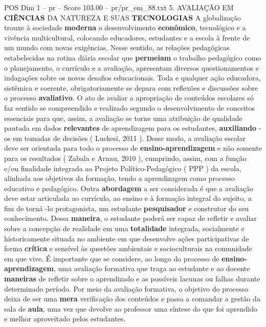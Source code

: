 \begin{textsample}{POS Dim 1 – pr – Score 103.00 – pr/pr\_em\_88.txt}  \label{ex:f1_pos_021}
5.
AVALIAÇÃO EM \textbf{CIÊNCIAS} DA NATUREZA E SUAS \textbf{TECNOLOGIAS} A globalização trouxe à sociedade \textbf{moderna} o desenvolvimento \textbf{econômico}, tecnológico e a vivência multicultural, colocando educadores, estudantes e a escola à frente de um mundo com novas exigências.
Nesse sentido, as relações pedagógicas estabelecidas na rotina diária escolar que \textbf{permeiam} o trabalho pedagógico como o planejamento, o currículo e a avaliação, apresentam diversos questionamentos e indagações sobre os novos desafios educacionais.
Toda e qualquer ação educadora, sistêmica e coerente, obrigatoriamente se depara com reflexões e discussões sobre o processo \textbf{avaliativo}.
O ato de avaliar a apropriação de conteúdos escolares só faz sentido se compreendido e realizado segundo o desenvolvimento de conceitos essenciais para que, assim, a avaliação se torne uma atribuição de qualidade pautada em dados \textbf{relevantes} de aprendizagem para os estudantes, \textbf{auxiliando} -os em tomadas de decisões ( Luckesi, 2011 ).
Desse modo, a avaliação escolar deve ser orientada para todo o processo de \textbf{ensino-aprendizagem} e não somente para os resultados ( Zabala e Arnau, 2010 ), cumprindo, assim, com a função e/ou finalidade integrada ao Projeto Político-Pedagógico ( PPP ) da escola, alinhada aos objetivos da formação, tendo a aprendizagem como processo educativo e pedagógico.
Outra \textbf{abordagem} a ser considerada é que a avaliação deve estar articulada ao currículo, ao ensino e à formação integral do sujeito, a fim de torná -lo protagonista, um estudante \textbf{pesquisador} e construtor do seu conhecimento.
Dessa \textbf{maneira}, o estudante poderá ser capaz de refletir e avaliar sobre a concepção de realidade em uma \textbf{totalidade} integrada, socialmente e historicamente situada no ambiente em que desenvolve ações participativas de forma \textbf{crítica} e sensível às questões ambientais e socioculturais na comunidade em que vive.
É importante que se considere, ao longo do processo de \textbf{ensino-aprendizagem}, uma avaliação formativa que traga ao estudante e ao docente \textbf{maneiras} de refletir sobre o aprendizado e as possíveis lacunas ou falhas durante determinado período.
Por meio da avaliação formativa, o objetivo do processo deixa de ser uma \textbf{mera} verificação dos conteúdos e passa a comandar a gestão da sala de \textbf{aula}, uma vez que devolve ao professor uma síntese do que foi aprendido e melhor aproveitado pelos estudantes.

\end{textsample}
